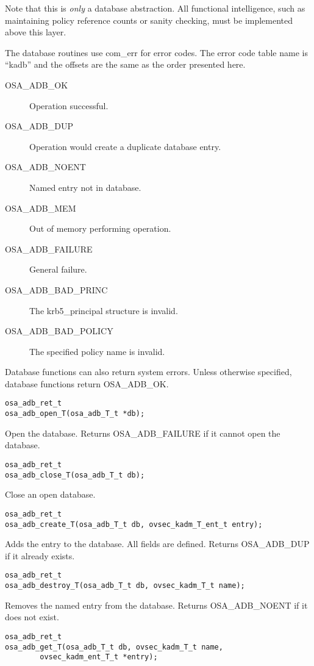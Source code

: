 Note that this is {\it only} a database abstraction.  All functional
intelligence, such as maintaining policy reference counts or sanity
checking, must be implemented above this layer.

The database routines use com_err for error codes.  The error code
table name is ``kadb'' and the offsets are the same as the order
presented here.

\begin{description}
\item[OSA_ADB_OK] Operation successful.
\item[OSA_ADB_DUP] Operation would create a duplicate database entry.
\item[OSA_ADB_NOENT] Named entry not in database.
\item[OSA_ADB_MEM] Out of memory performing operation.
\item[OSA_ADB_FAILURE] General failure.
\item[OSA_ADB_BAD_PRINC] The krb5_principal structure is invalid.
\item[OSA_ADB_BAD_POLICY] The specified policy name is invalid.
\end{description}

Database functions can also return system errors.  Unless otherwise
specified, database functions return OSA_ADB_OK.

\begin{verbatim}
osa_adb_ret_t
osa_adb_open_T(osa_adb_T_t *db);
\end{verbatim}
%
Open the database.  Returns OSA_ADB_FAILURE if it cannot open the
database. 

\begin{verbatim}
osa_adb_ret_t
osa_adb_close_T(osa_adb_T_t db);
\end{verbatim}
%
Close an open database.

\begin{verbatim}
osa_adb_ret_t
osa_adb_create_T(osa_adb_T_t db, ovsec_kadm_T_ent_t entry);
\end{verbatim}
%
Adds the entry to the database.  All fields are defined.  Returns
OSA_ADB_DUP if it already exists.

\begin{verbatim}
osa_adb_ret_t
osa_adb_destroy_T(osa_adb_T_t db, ovsec_kadm_T_t name);
\end{verbatim}

Removes the named entry from the database.  Returns OSA_ADB_NOENT if
it does not exist.

\begin{verbatim}
osa_adb_ret_t
osa_adb_get_T(osa_adb_T_t db, ovsec_kadm_T_t name,
        ovsec_kadm_ent_T_t *entry); 
\end{verbatim}

